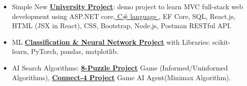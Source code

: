 
\begin{itemize}[itemsep=0pt, parsep=0pt, topsep=0pt]
  \item {\footnotesize Simple New \textbf{\textcolor{cyan}{\href{https://github.com/AsmaaJAH/simple-university-fullstack-web-project/tree/feature/apply_page}{ University Project}}}: demo project to learn MVC full-stack web development using ASP.NET core,{\textcolor{cyan}{\href{https://github.com/AsmaaJAH/Foundational-Csharp-with-Microsoft/tree/main}{ C\# language }}}, EF Core, SQL, React.js, HTML (JSX in React), CSS, Bootstrap, Node.js, Postman RESTful API.}
 \end{itemize}



\begin{itemize}[itemsep=0pt, parsep=0pt, topsep=0pt]
  \item{ \footnotesize ML \textbf{\textcolor{cyan}{\href{https://github.com/AsmaaJAH/Data-classifications-and-Neural-Network-using-random-data}{Classification \& Neural Network Project}}} with Libraries: scikit-learn, PyTorch, pandas, matplotlib. }
  \item {\footnotesize AI Search Algorithms: \textbf{\textcolor{cyan}{\href{https://github.com/AsmaaJAH/8_puzzle}{8-Puzzle Project}}} Game (Informed/Uninformed Algorithms), \textbf{\textcolor{cyan}{\href{https://github.com/AsmaaJAH/Connect-4-AI-Agent}{Connect-4 Project}}} Game AI Agent(Minimax Algorithm).}
 \end{itemize}


